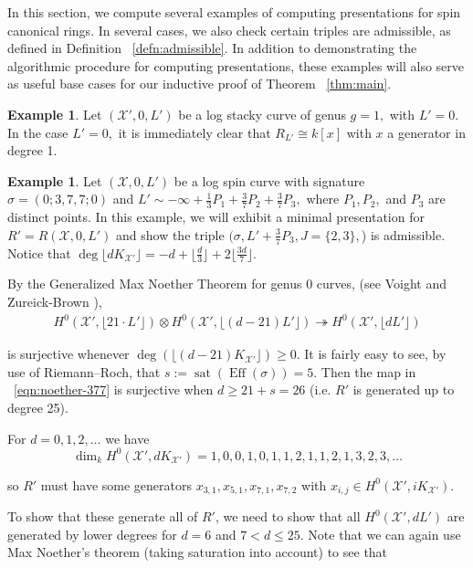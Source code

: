 \documentclass{amsart}
\theoremstyle{plain}
\theoremstyle{definition}
\newtheorem{example}[thm]{Example}
\theoremstyle{remark}
\numberwithin{equation}{section}
\newcommand\sx{\mathscr X}
\newcommand{\halfcan}{L}
\DeclareMathOperator{\Eff}{Eff}
\DeclareMathOperator{\sat}{sat}
\begin{document}
In this section, we compute several examples of computing presentations for spin canonical rings. In several cases, we also check certain triples are admissible, as defined in Definition ~\ref{defn:admissible}. In addition to demonstrating the algorithmic procedure for computing presentations, these examples will also serve as useful base cases for our inductive proof of Theorem ~\ref{thm:main}.

\begin{example}
\label{eg:base-1-0}
Let $(\sx',0,L')$ be a log stacky curve of genus $g = 1,$ with $\halfcan' = 0$. In the case $\halfcan' = 0,$ it is immediately clear that $R_{\halfcan'} \cong k[x]$ with $x$ a generator in degree 1.
\end{example}


\begin{example}
\label{eg:base-0-377}
Let $(\sx,0,\halfcan')$ be a log spin curve with signature $\sigma =
(0; 3, 7, 7; 0)$ and $\halfcan' \sim -\infty + \frac{1}{3} P_1 +
\frac{3}{7} P_2 + \frac{3}{7} P_3,$ where $P_1,P_2,$ and $P_3$ are
distinct points. In this example, we will exhibit a minimal
presentation for $R' = R(\sx,0,\halfcan')$ and show the triple
$(\sigma, \halfcan' + \frac{3}{7} P_3, J = \{2, 3\},$) is admissible.
Notice that $\deg \lfloor d K_{\sx'} \rfloor= -d + \lfloor \frac{d}{3}
\rfloor + 2 \lfloor \frac{3d}{7} \rfloor$.

By the Generalized Max Noether Theorem for genus 0 curves, (see Voight
and Zureick-Brown \cite[Lemma 3.1.1]{vzb:stacky}),
\begin{align}
\label{eqn:noether-377}
	H^0 (\sx', \lfloor 21 \cdot \halfcan' \rfloor) \otimes H^0 (\sx', \lfloor
	(d - 21) \halfcan' \rfloor) \twoheadrightarrow H^0 (\sx', \lfloor
	d \halfcan' \rfloor)
\end{align}

\noindent
is surjective whenever $\deg (\lfloor (d - 21) K_{\sx'} \rfloor)
\geq 0$. It is fairly easy to see, by use of Riemann--Roch, that
$s := \sat(\Eff(\sigma)) = 5$. Then the map in
~\eqref{eqn:noether-377} is surjective when $d \geq 21 + s = 26$
(i.e. $R'$ is generated up to degree 25).

For $d = 0, 1, 2, \ldots$ we have
\[
	\dim_k H^0 (\sx', d K_{\sx'}) = 1, 0, 0, 1, 0, 1, 1, 2, 1, 1, 2, 1, 3, 2, 3, \ldots
\]

\noindent
so $R'$ must have some generators $x_{3, 1}, x_{5, 1}, x_{7, 1},
x_{7, 2}$ with $x_{i, j} \in H^0(\sx', i K_{\sx'})$.

To show that these generate all of $R'$, we need to show that all
$H^0 (\sx', d \halfcan')$ are generated by lower degrees for $d = 6$
and $7 < d \leq 25$. Note that we can again use Max Noether's theorem
(taking saturation into account) to see that


\end{example}
\end{document}
